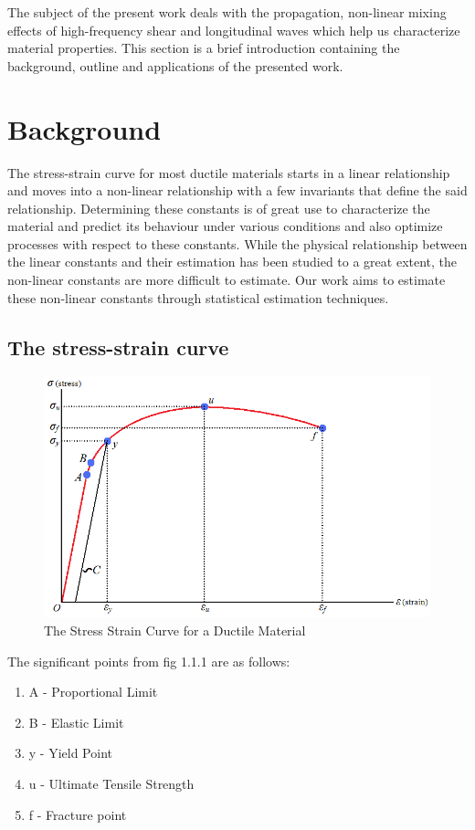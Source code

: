 The subject of the present work deals with the propagation, non-linear mixing effects of high-frequency shear and longitudinal waves which help us characterize material properties. This section is a brief introduction containing the background, outline and applications of the presented work.

\section{Background}
The stress-strain curve for most ductile materials starts in a linear relationship and moves into a non-linear relationship with a few invariants that define the said relationship. Determining these constants is of great use to characterize the material and predict its behaviour under various conditions and also optimize processes with respect to these constants. While the physical relationship between the linear constants and their estimation has been studied to a great extent, the non-linear constants are more difficult to estimate. Our work aims to estimate these non-linear constants through statistical estimation techniques.

\subsection{The stress-strain curve}
\begin{center}
\begin{figure}
\includegraphics[scale=0.6]{images/chapter_1/stressstrain.png}
\caption{The Stress Strain Curve for a Ductile Material}
\end{figure}
\end{center}
The significant points from fig 1.1.1 are as follows:
\begin{enumerate}
\item A - Proportional Limit
\item B - Elastic Limit
\item y - Yield Point
\item u - Ultimate Tensile Strength
\item f - Fracture point
\end{enumerate}
